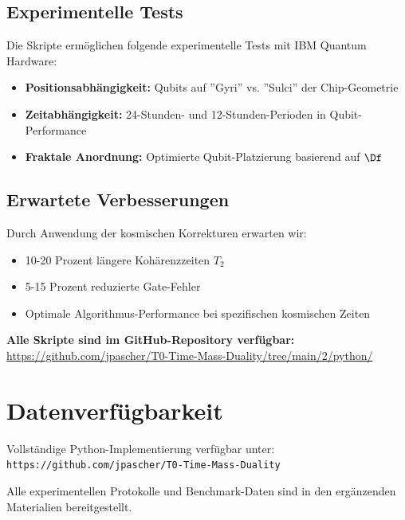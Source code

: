 \subsection{Experimentelle Tests}

Die Skripte ermöglichen folgende experimentelle Tests mit IBM Quantum Hardware:

\begin{itemize}
	\item \textbf{Positionsabhängigkeit:} Qubits auf ''Gyri'' vs. ''Sulci'' der Chip-Geometrie
	\item \textbf{Zeitabhängigkeit:} 24-Stunden- und 12-Stunden-Perioden in Qubit-Performance
	\item \textbf{Fraktale Anordnung:} Optimierte Qubit-Platzierung basierend auf $\Df$
\end{itemize}

\subsection{Erwartete Verbesserungen}

Durch Anwendung der kosmischen Korrekturen erwarten wir:

\begin{itemize}
	\item 10-20 Prozent längere Kohärenzzeiten $T_2$
	\item 5-15 Prozent reduzierte Gate-Fehler
	\item Optimale Algorithmus-Performance bei spezifischen kosmischen Zeiten
\end{itemize}

\textbf{Alle Skripte sind im GitHub-Repository verfügbar:} \\
\url{https://github.com/jpascher/T0-Time-Mass-Duality/tree/main/2/python/}

\section*{Datenverfügbarkeit}

Vollständige Python-Implementierung verfügbar unter: \\
\texttt{https://github.com/jpascher/T0-Time-Mass-Duality}

Alle experimentellen Protokolle und Benchmark-Daten sind in den ergänzenden Materialien bereitgestellt.


